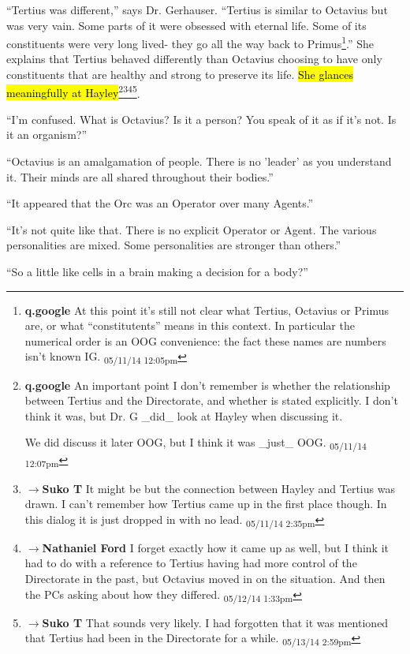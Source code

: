 ``Tertius was different,'' says Dr. Gerhauser.  ``Tertius is similar to Octavius but was very vain.  Some parts of it were obsessed with eternal life.  Some of its constituents were very long lived- they go all the way back to Primus\footnote{\textbf{q.google }At this point it's still not clear what Tertius, Octavius or Primus are, or what ``constitutents'' means in this context.  In particular the numerical order is an OOG convenience: the fact these names are numbers isn't known IG. \textsubscript{05/11/14 12:05pm}}.''  She explains that Tertius behaved differently than Octavius choosing to have only constituents that are healthy and strong to preserve its life.  \hl{She glances meaningfully at Hayley}\footnote{\textbf{q.google }An important point I don't remember is whether the relationship between Tertius and the Directorate, and whether is stated explicitly.  I don't think it was, but Dr. G \_did\_ look at Hayley when discussing it.

We did discuss it later OOG, but I think it was \_just\_ OOG. \textsubscript{05/11/14 12:07pm}}\footnote{$\rightarrow$\textbf{Suko T }It might be but the connection between Hayley and Tertius was drawn. I can't remember how Tertius came up in the first place though.  In this dialog it is just dropped in with no lead. \textsubscript{05/11/14 2:35pm}}\footnote{$\rightarrow$\textbf{Nathaniel Ford }I forget exactly how it came up as well, but I think it had to do with a reference to Tertius having had more control of the Directorate in the past, but Octavius moved in on the situation. And then the PCs asking about how they differed. \textsubscript{05/12/14 1:33pm}}\footnote{$\rightarrow$\textbf{Suko T }That sounds very likely.  I had forgotten that it was mentioned that Tertius had been in the Directorate for a while. \textsubscript{05/13/14 2:59pm}}.

``I'm confused.  What is Octavius?  Is it a person?  You speak of it as if it's not.  Is it an organism?''

``Octavius is an amalgamation of people.  There is no 'leader' as you understand it.  Their minds are all shared throughout their bodies.''

``It appeared that the Orc was an Operator over many Agents.''

``It's not quite like that.  There is no explicit Operator or Agent.  The various personalities are mixed.  Some personalities are stronger than others.''

``So a little like cells in a brain making a decision for a body?''

